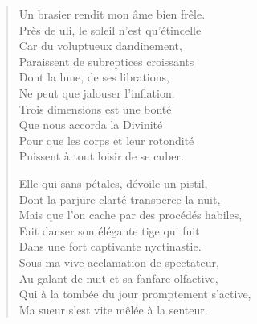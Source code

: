 \begin{verse}
  Un brasier rendit mon âme bien frêle.\\  %
  Près de uli, le soleil n’est qu’étincelle\\  %
  Car du voluptueux dandinement,\\  %
  Paraissent de subreptices croissants\\  %
  Dont la lune, de ses librations,\\  %
  Ne peut que jalouser l’inflation.\\  %
  Trois dimensions est une bonté\\  %
  Que nous accorda la Divinité\\  %
  Pour que les corps et leur rotondité\\  %
  Puissent à tout loisir de se cuber. 

  Elle qui sans pétales, dévoile un pistil,\\  %
  Dont la parjure clarté transperce la nuit,\\  %
  Mais que l’on cache par des procédés habiles,\\  %
  Fait danser son élégante tige qui fuit\\  %
  Dans une fort captivante nyctinastie.\\  %
  Sous ma vive acclamation de spectateur,\\  %
  Au galant de nuit et sa fanfare olfactive,\\  %
  Qui à la tombée du jour promptement s’active,\\  %
  Ma sueur s’est vite mêlée à la senteur.


\end{verse}
